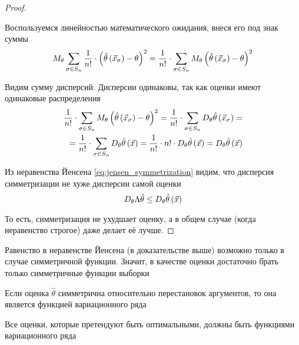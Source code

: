 \begin{proof}
\begin{enumerate}
            Воспользуемся линейностью математического ожидания,
            внеся его под знак суммы
            \begin{align*}
                M_{\theta} \sum_{\sigma\in S_n}\frac{1}{n!}\cdot
                    \left(\hat{\theta}\left(\vec{x}_\sigma\right)
                    -\theta\right)^2
                =\frac{1}{n!}\cdot\sum_{\sigma\in S_n}
                    M_{\theta} 
                        \left(\hat{\theta}\left(\vec{x}_\sigma\right)
                        -\theta\right)^2
            \end{align*}

            Видим сумму дисперсий.
            Дисперсии одинаковы, так как оценки имеют одинаковые распределения
            \begin{align*}
                \frac{1}{n!}\cdot\sum_{\sigma\in S_n}
                    M_{\theta} 
                        \left(\hat{\theta}\left(\vec{x}_\sigma\right)
                        -\theta\right)^2
                =\frac{1}{n!}\cdot\sum_{\sigma\in S_n}
                    D_{\theta} 
                        \hat{\theta}\left(\vec{x}_\sigma\right)=\\
                =\frac{1}{n!}\cdot\sum_{\sigma\in S_n}
                    D_{\theta} \hat{\theta}\left(\vec{x}\right)
                =\frac{1}{n!}\cdot n!
                    \cdot D_{\theta} \hat{\theta}\left(\vec{x}\right)
                =D_{\theta} \hat{\theta}\left(\vec{x}\right)
            \end{align*}

            Из неравенства Йенсена \eqref{eq:jensen_symmetrization} видим,
            что дисперсия симметризации не хуже дисперсии самой оценки
            $$D_{\theta} \Lambda\hat{\theta}
                \le D_{\theta} \hat{\theta}\left({\vec{x}}\right)$$

    \end{enumerate}

    То есть, симметризация не ухудшает оценку,
    а в общем случае (когда неравенство строгое) даже делает её лучше.
\end{proof}

\begin{remark}
    Равенство в неравенстве Йенсена (в доказательстве выше)
    возможно только в случае симметричной функции.
    Значит,
    в качестве оценки достаточно брать только симметричные функции выборки
\end{remark}
\begin{definition}
    Если оценка $\hat{\theta}$ симметрична относительно перестановок аргументов,
    то она является функцией вариационного ряда
\end{definition}
\begin{remark}
    Все оценки, которые претендуют быть оптимальными,
    должны быть функциями вариационного ряда
\end{remark}
